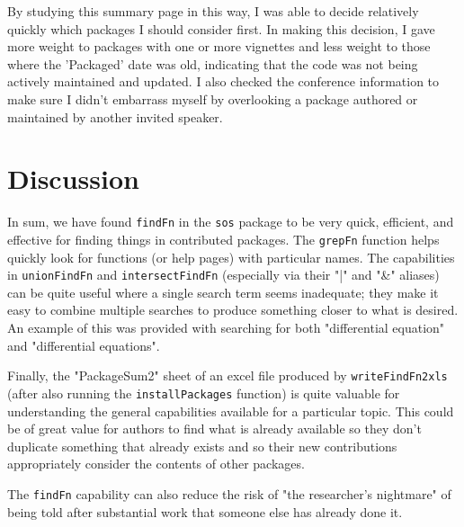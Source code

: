 By studying this summary page in this way, I was able to decide
relatively quickly which packages I should consider first.  In
making this decision, I gave more weight to packages with
one or more vignettes and less weight to those where the
'Packaged' date was old, indicating that the code was not being
actively maintained and updated.  I also checked the conference
information to make sure I didn't embarrass myself by overlooking
a package authored or maintained by another invited speaker.

\section*{Discussion}
In sum, we have found {\tt findFn} in the {\tt sos} package to
be very quick, efficient, and effective for finding things in
contributed packages.  The {\tt grepFn} function helps quickly
look for functions (or help pages) with particular names.
The capabilities in {\tt unionFindFn} and {\tt intersectFindFn} 
(especially via their "|" and "\&" aliases) can be quite useful 
where a single search term seems inadequate;  they make it easy 
to combine multiple searches to produce something closer to what 
is desired.  An example of this was provided with searching for 
both "differential equation" and "differential equations".

Finally, the "PackageSum2" sheet of an excel file produced by
{\tt writeFindFn2xls} (after also running the {\tt installPackages} 
function) is quite valuable for understanding the
general capabilities available for a particular topic.
This could be of great value for authors to find what is already
available so they don't duplicate something that already exists
and so their new contributions appropriately consider
the contents of other packages.

The {\tt findFn} capability can also reduce the risk
of "the researcher's nightmare" of being told after
substantial work that someone else has already done it.


